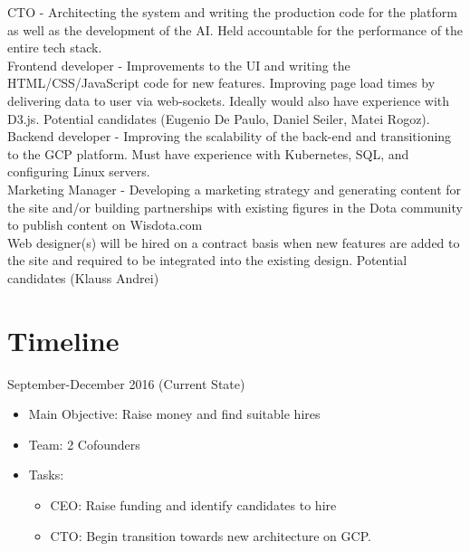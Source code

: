 \documentclass[12pt]{report} %
\begin{document}
CTO - Architecting the system and writing the production code for the platform as well as the development of the AI. Held accountable for the performance of the entire tech stack.\\ 

Frontend developer - Improvements to the UI and writing the HTML/CSS/JavaScript code for new features. Improving page load times by delivering data to user via web-sockets. Ideally would also have experience with D3.js. Potential candidates (Eugenio De Paulo, Daniel Seiler, Matei Rogoz).\\ 

Backend developer -  Improving the scalability of the back-end and transitioning to the GCP platform. Must have experience with Kubernetes, SQL, and configuring Linux servers.\\

Marketing Manager - Developing a marketing strategy and generating content for the site and/or building partnerships with existing figures in the Dota community to publish content on Wisdota.com\\

Web designer(s) will be hired on a contract basis when new features are added to the site and required to be integrated into the existing design. Potential candidates (Klauss Andrei)

\section{Timeline}

September-December 2016 (Current State)
\begin{itemize}
\item Main Objective: Raise money and find suitable hires
\item Team: 2 Cofounders 
\item Tasks:
\begin{itemize}
\item CEO: Raise funding and identify candidates to hire 
\item CTO: Begin transition towards new architecture on GCP.\\
\end{itemize}
\end{itemize}
\end{document}
